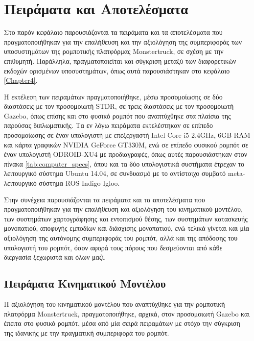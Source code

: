 
\chapter{Πειράματα και Αποτελέσματα} \label{Chapter5}
Στο παρόν κεφάλαιο παρουσιάζονται τα πειράματα και τα αποτελέσματα που πραγματοποιήθηκαν για την επαλήθευση και την αξιολόγηση της συμπεριφοράς των υποσυστημάτων της ρομποτικής πλατφόρμας Monstertruck, σε σχέση με την επιθυμητή. Παράλληλα, πραγματοποιείται και σύγκριση μεταξύ των διαφορετικών εκδοχών ορισμένων υποσυστημάτων, όπως αυτά παρουσιάστηκαν στο κεφάλαιο \ref{Chapter4}. 

\bigskip
Η εκτέλεση των πειραμάτων πραγματοποιήθηκε, μέσω προσομοίωσης σε δύο διαστάσεις με τον προσομοιωτή STDR, σε τρεις διαστάσεις με τον προσομοιωτή Gazebo, όπως επίσης και στο φυσικό ρομπότ που αναπτύχθηκε στα πλαίσια της παρούσας διπλωματικής. Τα εν λόγω πειράματα εκτελέστηκαν σε επίπεδο προσομοίωσης σε έναν υπολογιστή με επεξεργαστή Intel Core i5 2.4GHz, 6GB RAM και κάρτα γραφικών NVIDIA GeForce GT330M, ενώ σε επίπεδο φυσικού ρομπότ σε έναν υπολογιστή ODROID-XU4 με προδιαγραφές, όπως αυτές παρουσιάστηκαν στον πίνακα \ref{tab:computer_specs}, όπου και τα δύο υπολογιστικά συστήματα έτρεχαν το λειτουργικό σύστημα Ubuntu 14.04, σε συνδυασμό με το αντίστοιχο συμβατό meta-λειτουργικό σύστημα ROS Indigo Igloo.

\bigskip
Στην συνέχεια παρουσιάζονται τα πειράματα και τα αποτελέσματα που πραγματοποιήθηκαν για την επαλήθευση και αξιολόγηση του κινηματικού μοντέλου, των συστημάτων χαρτογράφησης και εντοπισμού θέσης, των συστημάτων κατασκευής μονοπατιού, αποφυγής εμποδίων και διάσχισης μονοπατιού, ενώ τελικά γίνεται και μία αξιολόγηση της αυτόνομης συμπεριφοράς του ρομπότ, αλλά και της απόδοσης του υπολογιστή του ρομπότ, όσον αφορά τους πόρους που δεσμεύονται από κάθε διεργασία ξεχωριστά και όλων μαζί.

\section{Πειράματα Κινηματικού Μοντέλου} \label{sec:kinematics_experiments}  %
Η αξιολόγηση του κινηματικού μοντέλου που αναπτύχθηκε για την ρομποτική πλατφόρμα Monstertruck, πραγματοποιήθηκε, αρχικά, στον προσομοιωτή Gazebo και έπειτα στο φυσικό ρομπότ, μέσα από μία σειρά πειραμάτων με στόχο την σύγκριση της ιδανικής με την πραγματική συμπεριφορά του ρομπότ.  

